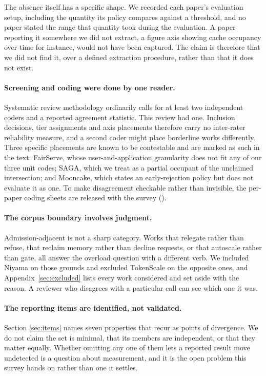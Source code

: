 The absence itself has a specific shape. We recorded each paper's
evaluation setup, including the quantity its policy compares against a
threshold, and no paper stated the range that quantity took during the
evaluation. A paper reporting it somewhere we did not extract, a figure
axis showing cache occupancy over time for instance, would not have
been captured. The claim is therefore that we did not find it, over a
defined extraction procedure, rather than that it does not exist.

\paragraph{Screening and coding were done by one reader.} Systematic
review methodology ordinarily calls for at least two independent coders
and a reported agreement statistic. This review had one. Inclusion
decisions, tier assignments and axis placements therefore carry no
inter-rater reliability measure, and a second coder might place
borderline works differently. Three specific placements are known to be
contestable and are marked as such in the text: FairServe, whose
user-and-application granularity does not fit any of our three unit
codes; SAGA, which we treat as a partial occupant of the unclaimed
intersection; and Mooncake, which states an early-rejection policy but
does not evaluate it as one. To make disagreement checkable rather than
invisible, the per-paper coding sheets are released with the survey
(\artifacturl).

\paragraph{The corpus boundary involves judgment.} Admission-adjacent
is not a sharp category. Works that relegate rather than refuse, that
reclaim memory rather than decline requests, or that autoscale rather
than gate, all answer the overload question with a different verb. We
included Niyama on those grounds and excluded TokenScale on the
opposite ones, and Appendix~\ref{sec:excluded} lists every work
considered and set aside with the reason. A reviewer who disagrees with
a particular call can see which one it was.

\paragraph{The reporting items are identified, not validated.} Section
\ref{sec:items} names seven properties that recur as points of
divergence. We do not claim the set is minimal, that its members are
independent, or that they matter equally. Whether omitting any one of
them lets a reported result move undetected is a question about
measurement, and it is the open problem this survey hands on rather
than one it settles.


